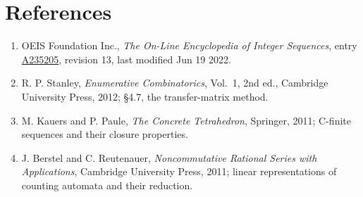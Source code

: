 \documentclass[11pt]{article}
\theoremstyle{definition}
\begin{document}
\section{References}

\begin{enumerate}

\item OEIS Foundation Inc., \emph{The On-Line Encyclopedia of Integer Sequences}, entry \href{https://oeis.org/A235205}{A235205}, revision 13, last modified Jun 19 2022.

\item R. P. Stanley, \emph{Enumerative Combinatorics}, Vol.~1, 2nd ed., Cambridge University Press, 2012; \S4.7, the transfer-matrix method.

\item M. Kauers and P. Paule, \emph{The Concrete Tetrahedron}, Springer, 2011; C-finite sequences and their closure properties.

\item J. Berstel and C. Reutenauer, \emph{Noncommutative Rational Series with Applications}, Cambridge University Press, 2011; linear representations of counting automata and their reduction.

\end{enumerate}
\end{document}

